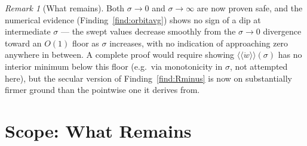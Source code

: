 \documentclass[12pt]{amsart}
\theoremstyle{plain}
\theoremstyle{remark}
\newtheorem*{remark}{Remark}
\begin{document}
\begin{remark}[What remains]
Both $\sigma\to0$ and $\sigma\to\infty$ are now proven safe, and the numerical evidence (Finding~\ref{find:orbitavg}) shows no sign of a dip at intermediate $\sigma$ --- the swept values decrease smoothly from the $\sigma\to0$ divergence toward an $O(1)$ floor as $\sigma$ increases, with no indication of approaching zero anywhere in between. A complete proof would require showing $\langle\langle\dot w\rangle\rangle(\sigma)$ has no interior minimum below this floor (e.g.\ via monotonicity in $\sigma$, not attempted here), but the secular version of Finding~\ref{find:Rminus} is now on substantially firmer ground than the pointwise one it derives from.
\end{remark}

\section{Scope: What Remains}
\end{document}
